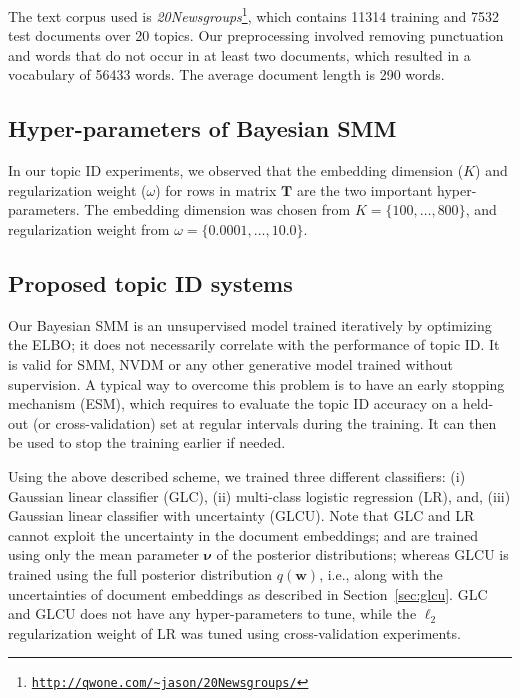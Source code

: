 \documentclass[journal]{IEEEtran}
\newcommand{\mb}[1]{\bm{#1}}
\newcommand{\bs}[1]{\bm{#1}}
\begin{document}
The text corpus used is 
\textit{20Newsgroups}\footnote{\texttt{\url{http://qwone.com/~jason/20Newsgroups/}}},
which contains 11314 training and 7532 test documents 
over 20 topics. Our preprocessing involved removing punctuation and 
words that do not occur in at least two documents, which resulted in a 
vocabulary of 56433 words. The average document length is 290 words.


\subsection{Hyper-parameters of Bayesian SMM}
\label{ssec:hyper}
In our topic ID experiments, we observed that the embedding dimension (\(K\))
and regularization weight (\(\omega\)) for rows in matrix \(\mb{T}\) are the 
two important hyper-parameters. The embedding dimension was chosen from 
\(K=\{100, \ldots, 800\}\), and regularization weight from \(\omega=\{0.0001, 
\ldots, 10.0\}\). 




\subsection{Proposed topic ID systems}
\label{ssec:proposed_sys}
Our Bayesian SMM is an unsupervised model trained iteratively by 
optimizing the ELBO; it does not necessarily correlate
with the performance of topic ID. It is valid for SMM, NVDM or any other 
generative model trained without supervision. A typical way to overcome this 
problem is to have an early stopping mechanism (ESM), which requires to 
evaluate the topic ID accuracy on a held-out (or cross-validation) set at 
regular intervals during the training. It can then be used to stop the 
training earlier if needed.

Using the above described scheme, we trained three different classifiers:
(i) Gaussian linear classifier (GLC), (ii) multi-class logistic 
regression (LR), and, (iii) Gaussian linear classifier with uncertainty 
(GLCU). Note that GLC and LR cannot exploit the uncertainty in the document 
embeddings; and are trained using only the mean parameter \(\bs{\nu}\) of the 
posterior distributions; whereas GLCU is trained using the full posterior 
distribution \(q(\mb{w})\), i.e., along with the uncertainties of document 
embeddings as described in Section~\ref{sec:glcu}. GLC and GLCU does not have 
any hyper-parameters to tune, while the \(\ell_2\) regularization weight of LR 
was tuned using cross-validation experiments.
\end{document}
